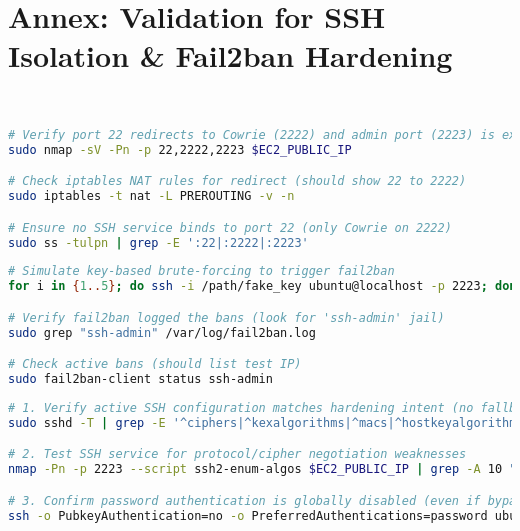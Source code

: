 \newpage

\section{Annex: Validation for SSH Isolation \& Fail2ban Hardening}  
\label{annex:network}
\
\
\begin{lstlisting}[language=bash, label={annexes:network}, caption={Network Isolation Verification}]  
# Verify port 22 redirects to Cowrie (2222) and admin port (2223) is exclusive  
sudo nmap -sV -Pn -p 22,2222,2223 $EC2_PUBLIC_IP  

# Check iptables NAT rules for redirect (should show 22 to 2222)  
sudo iptables -t nat -L PREROUTING -v -n  

# Ensure no SSH service binds to port 22 (only Cowrie on 2222)  
sudo ss -tulpn | grep -E ':22|:2222|:2223'  
\end{lstlisting}  



\begin{lstlisting}[language=bash, label={annexes:fail2ban}, caption={Fail2ban Efficacy Testing}]  
# Simulate key-based brute-forcing to trigger fail2ban  
for i in {1..5}; do ssh -i /path/fake_key ubuntu@localhost -p 2223; done  

# Verify fail2ban logged the bans (look for 'ssh-admin' jail)  
sudo grep "ssh-admin" /var/log/fail2ban.log  

# Check active bans (should list test IP)  
sudo fail2ban-client status ssh-admin  
\end{lstlisting}  



\begin{lstlisting}[language=bash, label={annexes:ssh-hardening}, caption={SSH Service Hardening Validation}]  
# 1. Verify active SSH configuration matches hardening intent (no fallback to weak protocols)  
sudo sshd -T | grep -E '^ciphers|^kexalgorithms|^macs|^hostkeyalgorithms'  

# 2. Test SSH service for protocol/cipher negotiation weaknesses  
nmap -Pn -p 2223 --script ssh2-enum-algos $EC2_PUBLIC_IP | grep -A 10 "algorithm negotiation"  

# 3. Confirm password authentication is globally disabled (even if bypass attempted)  
ssh -o PubkeyAuthentication=no -o PreferredAuthentications=password ubuntu@$EC2_PUBLIC_IP -p 2223  
\end{lstlisting}  






